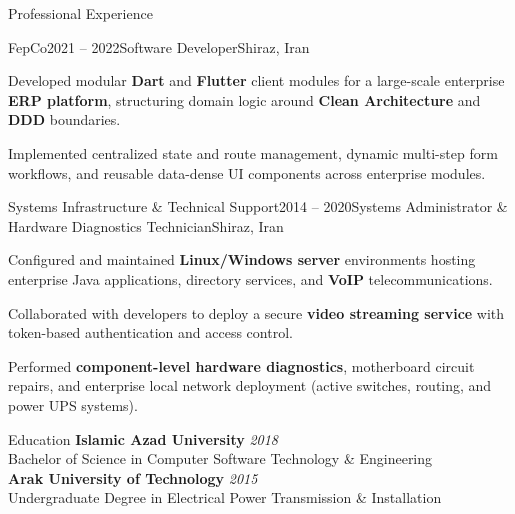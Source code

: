 \documentclass[
	a4paper,
	11pt,
]{resume}
\begin{document}
\begin{rSection}{Professional Experience}
    \begin{rSubsection}{FepCo}{2021 -- 2022}{Software Developer}{Shiraz, Iran}
        \item Developed modular \textbf{Dart} and \textbf{Flutter} client modules for a large-scale enterprise \textbf{ERP platform}, structuring domain logic around \textbf{Clean Architecture} and \textbf{DDD} boundaries.
        \item Implemented centralized state and route management, dynamic multi-step form workflows, and reusable data-dense UI components across enterprise modules.
        \\      
    \end{rSubsection}

    \begin{rSubsection}{Systems Infrastructure \& Technical Support}{2014 -- 2020}{Systems Administrator \& Hardware Diagnostics Technician}{Shiraz, Iran}
        \item Configured and maintained \textbf{Linux/Windows server} environments hosting enterprise Java applications, directory services, and \textbf{VoIP} telecommunications.
        \item Collaborated with developers to deploy a secure \textbf{video streaming service} with token-based authentication and access control.
        \item Performed \textbf{component-level hardware diagnostics}, motherboard circuit repairs, and enterprise local network deployment (active switches, routing, and power UPS systems).
        \\      
    \end{rSubsection}

\end{rSection}


\begin{rSection}{Education}
    \textbf{Islamic Azad University} \hfill \textit{2018} \\
    Bachelor of Science in Computer Software Technology \& Engineering \\[2pt]
    \textbf{Arak University of Technology} \hfill \textit{2015} \\
    Undergraduate Degree in Electrical Power Transmission \& Installation
\end{rSection}
\end{document}
